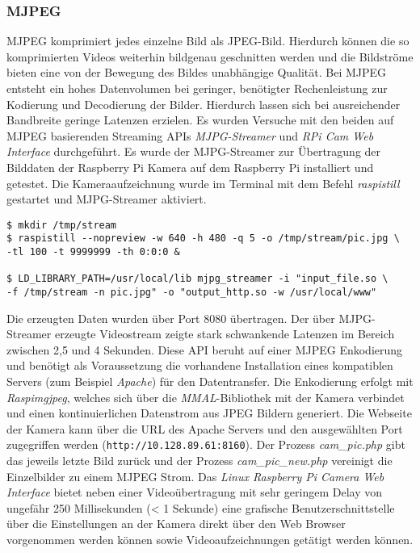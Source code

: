 \documentclass[BMR,Bachelor,ngerman]{twbook}%
\begin{document}
\subsubsection{\acf{MJPEG}} 
\ac{MJPEG} komprimiert jedes einzelne Bild als \ac{JPEG}-Bild. Hierdurch können die so komprimierten Videos weiterhin bildgenau geschnitten werden und die Bildströme bieten eine von der Bewegung des Bildes unabhängige Qualität. Bei \ac{MJPEG} entsteht ein hohes Datenvolumen bei geringer, benötigter Rechenleistung zur Kodierung und Decodierung der Bilder. Hierdurch lassen sich bei ausreichender Bandbreite geringe Latenzen erzielen. Es wurden Versuche mit den beiden auf \ac{MJPEG} basierenden Streaming \acp{API} \emph{MJPG-Streamer} und \emph{RPi Cam Web Interface} durchgeführt.
Es wurde der MJPG-Streamer zur Übertragung der Bilddaten der Raspberry Pi Kamera auf dem Raspberry Pi installiert und getestet. Die Kameraaufzeichnung wurde im Terminal mit dem Befehl \emph{raspistill} gestartet und MJPG-Streamer aktiviert.
\begin{verbatim}
$ mkdir /tmp/stream
$ raspistill --nopreview -w 640 -h 480 -q 5 -o /tmp/stream/pic.jpg \
-tl 100 -t 9999999 -th 0:0:0 &

$ LD_LIBRARY_PATH=/usr/local/lib mjpg_streamer -i "input_file.so \
-f /tmp/stream -n pic.jpg" -o "output_http.so -w /usr/local/www"\end{verbatim}
%
Die erzeugten Daten wurden über Port 8080 übertragen. Der über MJPG-Streamer erzeugte Videostream zeigte stark schwankende Latenzen im Bereich zwischen 2,5 und 4 Sekunden.
\minisec{Linux RPi Cam Web Interface}
Diese \ac{API} beruht auf einer MJPEG Enkodierung und benötigt als Voraussetzung die vorhandene Installation eines kompatiblen Servers (zum Beispiel \emph{Apache}) für den Datentransfer. Die Enkodierung erfolgt mit \emph{Raspimgjpeg}, welches sich über die \emph{MMAL}-Bibliothek mit der Kamera verbindet und einen kontinuierlichen Datenstrom aus \ac{JPEG} Bildern generiert. Die Webseite der Kamera kann über die \ac{URL} des Apache Servers und den ausgewählten Port zugegriffen werden (\verb+http://10.128.89.61:8160+). Der Prozess \emph{cam\_pic.php} gibt das jeweils letzte Bild zurück und der Prozess \emph{cam\_pic\_new.php} vereinigt die Einzelbilder zu einem \ac{MJPEG} Strom. Das \emph{Linux Raspberry Pi Camera Web Interface} bietet neben einer Videoübertragung mit sehr geringem Delay von ungefähr 250 Millisekunden (< 1 Sekunde) eine grafische Benutzerschnittstelle über die Einstellungen an der Kamera direkt über den Web Browser vorgenommen werden können sowie Videoaufzeichnungen getätigt werden können.
%
\end{document}

